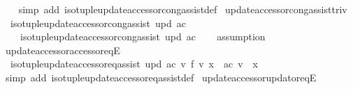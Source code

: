 \begin{isabellebody}
%
\isadelimproof
\ \ %
\endisadelimproof
%
\isatagproof
{}\isamarkupfalse%
\ {\isacharparenleft}{\kern0pt}simp\ add{\isacharcolon}{\kern0pt}\ iso{\isacharunderscore}{\kern0pt}tuple{\isacharunderscore}{\kern0pt}update{\isacharunderscore}{\kern0pt}accessor{\isacharunderscore}{\kern0pt}cong{\isacharunderscore}{\kern0pt}assist{\isacharunderscore}{\kern0pt}def{\isacharparenright}{\kern0pt}%
\endisatagproof
{\isafoldproof}%
%
\isadelimproof
\isanewline
%
\endisadelimproof
\isanewline
{}\isamarkupfalse%
\ update{\isacharunderscore}{\kern0pt}accessor{\isacharunderscore}{\kern0pt}cong{\isacharunderscore}{\kern0pt}assist{\isacharunderscore}{\kern0pt}triv{\isacharcolon}{\kern0pt}\isanewline
\ \ {\isachardoublequoteopen}iso{\isacharunderscore}{\kern0pt}tuple{\isacharunderscore}{\kern0pt}update{\isacharunderscore}{\kern0pt}accessor{\isacharunderscore}{\kern0pt}cong{\isacharunderscore}{\kern0pt}assist\ upd\ ac\ {\isasymLongrightarrow}\isanewline
\ \ \ \ iso{\isacharunderscore}{\kern0pt}tuple{\isacharunderscore}{\kern0pt}update{\isacharunderscore}{\kern0pt}accessor{\isacharunderscore}{\kern0pt}cong{\isacharunderscore}{\kern0pt}assist\ upd\ ac{\isachardoublequoteclose}\isanewline
%
\isadelimproof
\ \ %
\endisadelimproof
%
\isatagproof
{}\isamarkupfalse%
\ assumption%
\endisatagproof
{\isafoldproof}%
%
\isadelimproof
\isanewline
%
\endisadelimproof
\isanewline
{}\isamarkupfalse%
\ update{\isacharunderscore}{\kern0pt}accessor{\isacharunderscore}{\kern0pt}accessor{\isacharunderscore}{\kern0pt}eqE{\isacharcolon}{\kern0pt}\isanewline
\ \ {\isachardoublequoteopen}iso{\isacharunderscore}{\kern0pt}tuple{\isacharunderscore}{\kern0pt}update{\isacharunderscore}{\kern0pt}accessor{\isacharunderscore}{\kern0pt}eq{\isacharunderscore}{\kern0pt}assist\ upd\ ac\ v\ f\ v{\isacharprime}{\kern0pt}\ x\ {\isasymLongrightarrow}\ ac\ v\ {\isacharequal}{\kern0pt}\ x{\isachardoublequoteclose}\isanewline
%
\isadelimproof
\ \ %
\endisadelimproof
%
\isatagproof
{}\isamarkupfalse%
\ {\isacharparenleft}{\kern0pt}simp\ add{\isacharcolon}{\kern0pt}\ iso{\isacharunderscore}{\kern0pt}tuple{\isacharunderscore}{\kern0pt}update{\isacharunderscore}{\kern0pt}accessor{\isacharunderscore}{\kern0pt}eq{\isacharunderscore}{\kern0pt}assist{\isacharunderscore}{\kern0pt}def{\isacharparenright}{\kern0pt}%
\endisatagproof
{\isafoldproof}%
%
\isadelimproof
\isanewline
%
\endisadelimproof
\isanewline
{}\isamarkupfalse%
\ update{\isacharunderscore}{\kern0pt}accessor{\isacharunderscore}{\kern0pt}updator{\isacharunderscore}{\kern0pt}eqE{\isacharcolon}{\kern0pt}\isanewline

\end{isabellebody}
